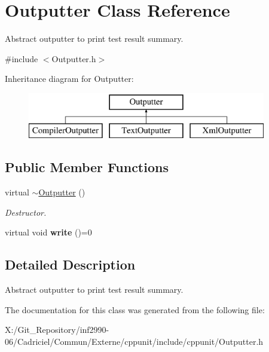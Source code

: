 \hypertarget{class_outputter}{\section{Outputter Class Reference}
\label{class_outputter}
}


Abstract outputter to print test result summary.  




{\ttfamily \#include $<$Outputter.\-h$>$}

Inheritance diagram for Outputter\-:\begin{figure}[H]
\begin{center}
\leavevmode
\includegraphics[height=2.000000cm]{class_outputter}
\end{center}
\end{figure}
\subsection*{Public Member Functions}
\begin{DoxyCompactItemize}
\item 
\hypertarget{class_outputter_a0af584ecb81380ff38e3875b65ad4dd5}{virtual \hyperlink{class_outputter_a0af584ecb81380ff38e3875b65ad4dd5}{$\sim$\-Outputter} ()}\label{class_outputter_a0af584ecb81380ff38e3875b65ad4dd5}

\begin{DoxyCompactList}\small\item\em Destructor. \end{DoxyCompactList}\item 
\hypertarget{class_outputter_a0a5f32693d53ed33ceb8385041cb4b68}{virtual void {\bfseries write} ()=0}\label{class_outputter_a0a5f32693d53ed33ceb8385041cb4b68}

\end{DoxyCompactItemize}


\subsection{Detailed Description}
Abstract outputter to print test result summary. 

The documentation for this class was generated from the following file\-:\begin{DoxyCompactItemize}
\item 
X\-:/\-Git\-\_\-\-Repository/inf2990-\/06/\-Cadriciel/\-Commun/\-Externe/cppunit/include/cppunit/Outputter.\-h\end{DoxyCompactItemize}
